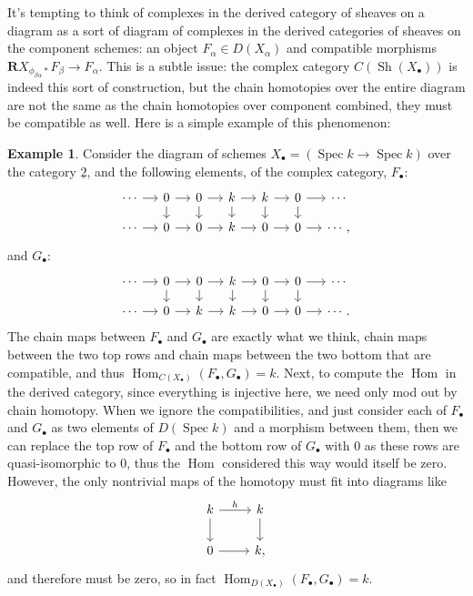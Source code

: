\documentclass[proquest]{uwthesis}[2014/11/13]
\theoremstyle{definition}
\newtheorem{example}[theorem]{Example}
\DeclareMathOperator{\Hom}{Hom}
\DeclareMathOperator{\Sh}{Sh}
\DeclareMathOperator{\Spec}{Spec}
\newcommand{\bR}{\textbf{R}}
\newcommand{\tu}{\underline{2}}
\begin{document}
It's tempting to think of complexes in the derived category of sheaves on a diagram as a sort of diagram of complexes in the derived categories of sheaves on the component schemes: an object $F_\alpha \in D(X_\alpha)$ and compatible morphisms $\bR X_{\phi_{\beta \alpha} *} F_\beta \rightarrow F_\alpha$.
This is a subtle issue: the complex category $C(\Sh(X_\bullet))$ is indeed this sort of construction, but the chain homotopies over the entire diagram are not the same as the chain homotopies over component combined, they must be compatible as well.
Here is a simple example of this phenomenon:
\begin{example}
	\label{ex:ddiagvsdiagd}
	Consider the diagram of schemes $X_\bullet = (\Spec k \rightarrow \Spec k)$ over the category $\tu$, and the following elements, of the complex category, $F_\bullet$:
	\[
		\begin{tikzcd}[column sep = small, row sep = small]
			\cdots \ar[r] & 0 \ar[r] \ar[d] & 0 \ar[r] \ar[d] & k \ar{r} \ar{d} & k \ar[r] \ar[d] & 0 \ar[r] \ar[d] & \cdots \\
			\cdots \ar[r] & 0 \ar[r] & 0 \ar[r] & k \ar[r] & 0 \ar[r] & 0 \ar[r] & \cdots,
		\end{tikzcd}
	\]
	and $G_\bullet$:
	\[
		\begin{tikzcd}[column sep = small, row sep = small]
			\cdots \ar[r] & 0 \ar[r] \ar[d] & 0 \ar[r] \ar[d] & k \ar[r] \ar[d] & 0 \ar[r] \ar[d] & 0 \ar[r] \ar[d] & \cdots \\
			\cdots \ar[r] & 0 \ar[r] & k \ar[r] & k \ar[r] & 0 \ar[r] & 0 \ar[r] & \cdots.
		\end{tikzcd}
	\]
	The chain maps between $F_\bullet$ and $G_\bullet$ are exactly what we think, chain maps between the two top rows and chain maps between the two bottom that are compatible, and thus $\Hom_{C(X_\bullet)}(F_\bullet, G_\bullet) = k$.
	Next, to compute the $\Hom$ in the derived category, since everything is injective here, we need only mod out by chain homotopy.
	When we ignore the compatibilities, and just consider each of $F_\bullet$ and $G_\bullet$ as two elements of $D(\Spec k)$ and a morphism between them, then we can replace the top row of $F_\bullet$ and the bottom row of $G_\bullet$ with 0 as these rows are quasi-isomorphic to 0, thus the $\Hom$ considered this way would itself be zero.
	However, the only nontrivial maps of the homotopy must fit into diagrams like
	\[
		\begin{tikzcd}
			k \arrow{r}{h} \ar[d] & k \ar[d] \\
			0 \ar[r] & k,
		\end{tikzcd}
	\]
	and therefore must be zero, so in fact $\Hom_{D(X_\bullet)}(F_\bullet, G_\bullet) = k$.
	

\end{example}
\end{document}
